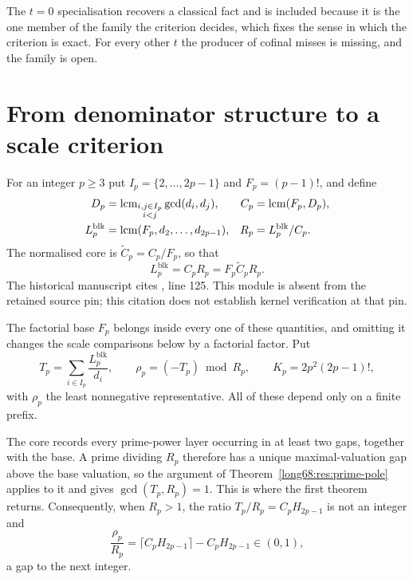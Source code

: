 \documentclass[11pt]{article}
\newcommand{\Lc}{L}
\begin{document}
The $t=0$ specialisation recovers a classical fact and is included because it
is the one member of the family the criterion decides, which fixes the sense
in which the criterion is exact.  For every other $t$ the
producer of cofinal misses is missing, and the family is open.

\section{From denominator structure to a scale criterion}\label{long68:sec:residue}

For an integer $p\ge3$ put $I_p=\{2,\ldots,2p-1\}$ and $F_p=(p-1)!$, and
define
\begin{align*}
 D_p&=\lcm_{\substack{i,j\in I_p\\ i<j}}\gcd(d_i,d_j),
 &C_p&=\lcm(F_p,D_p),\\
 \Lc^{\mathrm{blk}}_p&=\lcm(F_p,d_2,\ldots,d_{2p-1}),
 &R_p&=\Lc^{\mathrm{blk}}_p/C_p .
\end{align*}
The normalised core is $\widetilde C_p=C_p/F_p$, so that
\begin{equation}\label{long68:eq:core-normalisation}
 \Lc^{\mathrm{blk}}_p=C_pR_p=F_p\widetilde C_pR_p .
\end{equation}
  The historical manuscript cites , line 125. This module is absent from the retained source pin; this citation does not establish kernel verification at that pin.

The factorial base $F_p$ belongs inside every one of these quantities, and
omitting it changes the scale comparisons below by a factorial factor.  Put
\[
 T_p=\sum_{i\in I_p}\frac{\Lc^{\mathrm{blk}}_p}{d_i},\qquad
 \rho_p=(-T_p)\bmod R_p,\qquad
 K_p=2p^2(2p-1)! ,
\]
with $\rho_p$ the least nonnegative representative.  All of these depend only
on a finite prefix.

The core records every prime-power layer occurring in at least two gaps,
together with the base.  A prime dividing $R_p$ therefore has a unique
maximal-valuation gap above the base valuation, so the argument of
Theorem~\ref{long68:res:prime-pole} applies to it and gives $\gcd(T_p,R_p)=1$.  This
is where the first theorem returns.  Consequently, when $R_p>1$, the ratio
$T_p/R_p=C_pH_{2p-1}$ is not an integer and
\begin{equation}\label{long68:eq:gap-normalisation}
 \frac{\rho_p}{R_p}
 =\bigl\lceil C_pH_{2p-1}\bigr\rceil-C_pH_{2p-1}\in(0,1),
\end{equation}
a gap to the next integer.
\end{document}
